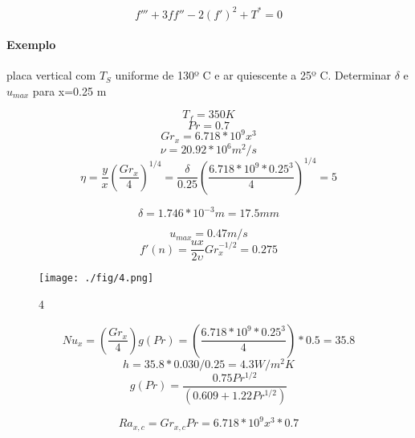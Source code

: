 \documentclass[a4paper, 12pt]{article}
\begin{document}
\[f'''+3ff''-2(f')^{2}+T^{*}=0\]

\paragraph*{Exemplo} 
placa vertical com $T_{S}$ uniforme de 130º C e ar quiescente a 25º C. Determinar $\delta$ e $u_{max}$ para x=0.25 m

\[T_{f}=350K\]
\[Pr=0.7\]
\[Gr_{x}=6.718*10^{9}x^{3}\]
\[\nu = 20.92*10^{6}m^{2}/s\]
\[\eta = \frac{y}{x}(\frac{Gr_{x}}{4})^{1/4}=\frac{\delta}{0.25}(\frac{6.718*10^{9}*0.25^{3}}{4})^{1/4}=5\]

\[\delta = 1.746*10^{-3}m=17.5mm\]

\[u_{max}=0.47m/s\]
\[f'(n)=\frac{ux}{2\upsilon}Gr_{x}^{-1/2}=0.275\]

\begin{figure}[h]
\begin{center}
\texttt{[image: ./fig/4.png]}
\caption{\label{fig:4}4} 
\end{center}
\end{figure}

\[Nu_{x}=(\frac{Gr_{x}}{4})g(Pr)=(\frac{6.718*10^{9}*0.25^{3}}{4})*0.5=35.8\]
\[h=35.8*0.030/0.25=4.3W/m^{2}K\]
\[g(Pr)=\frac{0.75Pr^{1/2}}{(0.609+1.22Pr^{1/2})}\]

\[Ra_{x,c}=Gr_{x,c}Pr=6.718*10^{9}x^{3}*0.7\]

\end{document}
